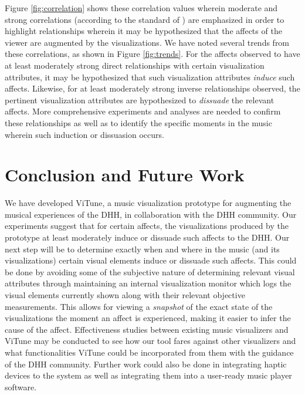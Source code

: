 \documentclass{sigchi-ext}
\begin{document}
Figure \ref{fig:correlation} shows these correlation values wherein moderate and strong correlations (according to the standard of \cite{Cohen:1988}) are emphasized in order to highlight relationships wherein it may be hypothesized that the affects of the viewer are augmented by the visualizations. We have noted several trends from these correlations, as shown in Figure \ref{fig:trends}. For the affects observed to have at least moderately strong direct relationships with certain visualization attributes, it may be hypothesized that such visualization attributes \textit{induce} such affects. Likewise, for at least moderately strong inverse relationships observed, the pertinent visualization attributes are hypothesized to \textit{dissuade} the relevant affects. More comprehensive experiments and analyses are needed to confirm these relationships as well as to identify the specific moments in the music wherein such induction or dissuasion occurs.


\section{Conclusion and Future Work}
We have developed ViTune, a music visualization prototype for augmenting the musical experiences of the DHH, in collaboration with the DHH community. Our experiments suggest that for certain affects, the visualizations produced by the prototype at least moderately induce or dissuade such affects to the DHH. Our next step will be to determine exactly when and where in the music (and its visualizations) certain visual elements induce or dissuade such affects. This could be done by avoiding some of the subjective nature of determining relevant visual attributes through maintaining an internal visualization monitor which logs the visual elements currently shown along with their relevant objective measurements. This allows for viewing a \textit{snapshot} of the exact state of the visualizations the moment an affect is experienced, making it easier to infer the cause of the affect. Effectiveness studies between existing music visualizers and ViTune may be conducted to see how our tool fares against other visualizers and what functionalities ViTune could be incorporated from them with the guidance of the DHH community. Further work could also be done in integrating haptic devices to the system as well as integrating them into a user-ready music player software.
\end{document}
